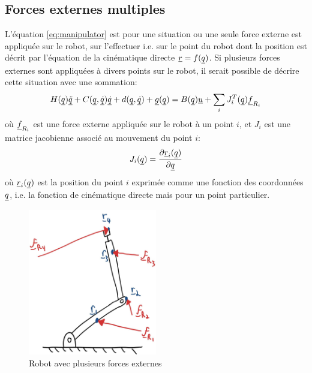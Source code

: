 \subsection{Forces externes multiples}

L'équation \eqref{eq:manipulator} est pour une situation ou une seule force externe est appliquée sur le robot, sur l'effectuer i.e. sur le point du robot dont la position est décrit par l'équation de la cinématique directe $\underline{r} = f(\underline{q})$. Si plusieurs forces externes sont appliquées à divers points sur le robot, il serait possible de décrire cette situation avec une sommation:
\begin{align}
H(\underline{q}) \underline{\ddot{q}} + C(\underline{q},\underline{\dot{q}}) \underline{\dot{q}} + d(\underline{q}, \underline{\dot{q}}) + \underline{g}(\underline{q}) = B(\underline{q}) \underline{u}  + \sum_i J_i^T(\underline{q}) \underline{f}_{R_i} 
\end{align}
où $\underline{f}_{R_i}$ est une force externe appliquée sur le robot à un point $i$, et $J_i$ est une matrice jacobienne associé au mouvement du point $i$:
\begin{align}
J_i(\underline{q}) = \frac{ \partial \underline{r}_i(\underline{q}) }{ \partial \underline{q} }
\end{align}
où $\underline{r}_i(\underline{q})$ est la position du point $i$ exprimée comme une fonction des coordonnées $\underline{q}$, i.e. la fonction de cinématique directe mais pour un point particulier. 

\begin{figure}[H]
	\centering
		\includegraphics[width=0.50\textwidth]{fig/multipleexternalforces.jpg}
	\caption{Robot avec plusieurs forces externes}%
	\label{fig:multipleexternalforces}
\end{figure}


